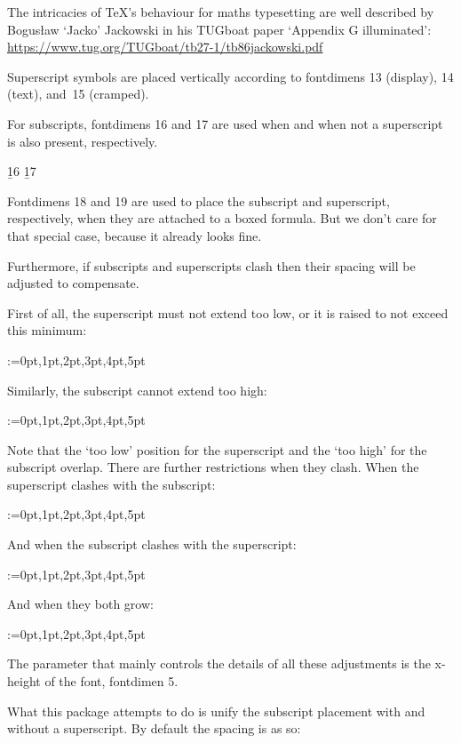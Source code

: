 \documentclass{article}
\begin{document}
The intricacies of \TeX's behaviour for maths typesetting are well described by Bogusław `Jacko' Jackowski in his TUGboat paper `Appendix G illuminated':
\url{https://www.tug.org/TUGboat/tb27-1/tb86jackowski.pdf}

Superscript symbols are placed vertically according to fontdimens 13 (display), 14 (text), and~15 (cramped).

\bigskip
{}

For subscripts, fontdimens 16 and 17 are used when and when not a superscript is also present, respectively.

\bigskip
\b{16}
\b{17}

Fontdimens 18 and 19 are used to place the subscript and superscript, respectively, when they are attached to a boxed formula. But we don't care for that special case, because it already looks fine.

Furthermore, if subscripts and superscripts clash then their spacing will be adjusted to compensate.

First of all, the superscript must not extend too low, or it is raised to not exceed this minimum:
\begin{center}
\@for\ii:={0pt,1pt,2pt,3pt,4pt,5pt}
\end{center}
Similarly, the subscript cannot extend too high:
\begin{center}
\@for\ii:={0pt,1pt,2pt,3pt,4pt,5pt}
\end{center}
Note that the `too low' position for the superscript and the `too high' for the subscript overlap. There are further restrictions when they clash. When the superscript clashes with the subscript:
\begin{center}
\@for\ii:={0pt,1pt,2pt,3pt,4pt,5pt}
\end{center}
And when the subscript clashes with the superscript:
\begin{center}
\@for\ii:={0pt,1pt,2pt,3pt,4pt,5pt}
\end{center}
And when they both grow:
\begin{center}
\@for\ii:={0pt,1pt,2pt,3pt,4pt,5pt}
\end{center}

The parameter that mainly controls the details of all these adjustments is the x-height of the font, fontdimen 5.

What this package attempts to do is unify the subscript placement with and without a superscript. By default the spacing is as so:

\begin{center}
\end{center}



\makeatother
\end{document}
